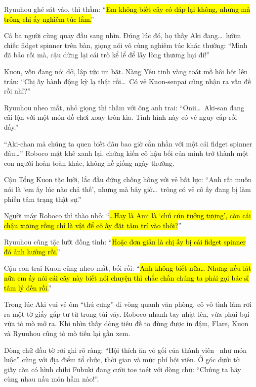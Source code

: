 \documentclass[../main.tex]{subfiles}
\begin{document}
Ryuuhou ghé sát vào, thì thầm: ``\hl{Em không biết cây có đáp lại không, nhưng mà trông chị ấy nghiêm túc lắm.}''

Cả ba người cùng quay đầu sang nhìn. Đúng lúc đó, họ thấy Aki đang\dots\ lườm chiếc fidget spinner trên bàn, giọng nói vô cùng nghiêm túc khác thường: ``Mình đã bảo rồi mà, cậu dừng lại cái trò kể lể để lấy lòng thương hại đi!''


Kuon, vốn đang nói dở, lập tức im bặt. Nàng Yêu tinh vàng toát mồ hôi hột lên trán: ``Chị ấy hành động kỳ lạ thật rồi\dots\ Có vẻ Kuon-senpai cũng nhận ra vấn đề rồi nhỉ?''

Ryuuhou nheo mắt, nhỏ giọng thì thầm với ông anh trai: ``Onii\dots\ Aki-san đang cãi lộn với một món đồ chơi xoay tròn kìa. Tình hình này có vẻ nguy cấp rồi đấy.''

``Aki-chan mà chúng ta quen biết đâu bao giờ cằn nhằn với một cái fidget spinner đâu\dots'' Roboco mặt khẽ xanh lại, chứng kiến cô hậu bối của mình trở thành một con người hoàn toàn khác, không hề giống ngày thường.

Cậu Tổng Kuon tặc lưỡi, lắc đầu đứng chống hông với vẻ bất lực: ``Anh rất muốn nói là `em ấy lúc nào chả thế', nhưng mà bây giờ\dots\ trông có vẻ cô ấy đang bị làm phiền tâm trạng thật sự.''

Người máy Roboco thì thào nhỏ: ``\hl{\dots Hay là Ami là `chú cún tưởng tượng', còn cái chậu xương rồng chỉ là vật để cô ấy đặt tâm trí vào thôi?}''

Ryuuhou cũng tặc lưỡi đồng tình: ``\hl{Hoặc đơn giản là chị ấy bị cái fidget spinner đó ảnh hưởng rồi.}''

Cậu con trai Kuon cũng nheo mắt, bối rối: ``\hl{Anh không biết nữa\dots{} Nhưng nếu lát nữa em ấy nói cái cây này biết nói chuyện thì chắc chắn chúng ta phải gọi bác sĩ tâm lý đến rồi.}''

Trong lúc Aki vui vẻ ôm ``thú cưng'' đi vòng quanh văn phòng, cô vô tình làm rơi ra một tờ giấy gấp tư từ trong túi váy. Roboco nhanh tay nhặt lên, vừa phủi bụi vừa tò mò mở ra. Khi nhìn thấy dòng tiêu đề to đùng được in đậm, Flare, Kuon và Ryuuhou cũng tò mò tiến lại gần xem.

Dòng chữ đầu tờ rơi ghi rõ ràng: ``Hội thích ăn vỏ gối của thành viên \hll\ như món luộc'' cùng với địa điểm tổ chức, thời gian và mức phí hội viên. Ở góc dưới tờ giấy còn có hình chibi Fubuki đang cười toe toét với dòng chữ: ``Chúng ta hãy cùng nhau nấu món hầm nào!''.
\end{document}
